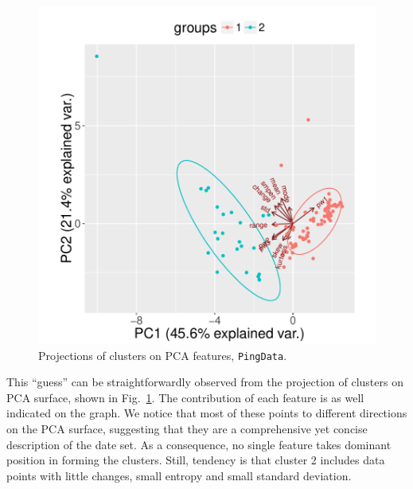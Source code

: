 \begin{figure}[!htb]
\centering
\includegraphics[width=.75\textwidth]{gfx/chap3/ping_pca_ping.pdf}
\caption{Projections of clusters on \ac{PCA} features, \texttt{PingData}.}
\label{fig:ping_pca}
\end{figure}

This ``guess'' can be straightforwardly observed from the projection of clusters on \acf{PCA} surface, shown in Fig.~\ref{fig:ping_pca}.
The contribution of each feature is as well indicated on the graph.
We notice that most of these points to different directions on the \ac{PCA} surface, suggesting that they are a comprehensive yet concise description of the date set.
As a consequence, no single feature takes dominant position in forming the clusters.
Still, tendency is that cluster 2 includes data points with little  changes, small entropy and small standard deviation. 

